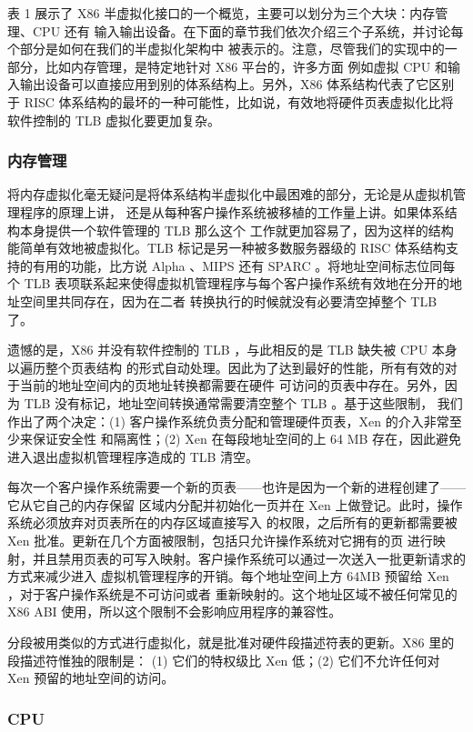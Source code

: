 表 1 展示了 X86 半虚拟化接口的一个概览，主要可以划分为三个大块：内存管理、CPU 还有
输入输出设备。在下面的章节我们依次介绍三个子系统，并讨论每个部分是如何在我们的半虚拟化架构中
被表示的。注意，尽管我们的实现中的一部分，比如内存管理，是特定地针对 X86 平台的，许多方面
例如虚拟 CPU 和输入输出设备可以直接应用到别的体系结构上。另外，X86 体系结构代表了它区别于
RISC 体系结构的最坏的一种可能性，比如说，有效地将硬件页表虚拟化比将软件控制的 TLB
虚拟化要更加复杂。

\subsubsection{内存管理}

将内存虚拟化毫无疑问是将体系结构半虚拟化中最困难的部分，无论是从虚拟机管理程序的原理上讲，
还是从每种客户操作系统被移植的工作量上讲。如果体系结构本身提供一个软件管理的 TLB 那么这个
工作就更加容易了，因为这样的结构能简单有效地被虚拟化。TLB 标记是另一种被多数服务器级的 RISC
体系结构支持的有用的功能，比方说 Alpha 、MIPS 还有 SPARC 。将地址空间标志位同每个 TLB
表项联系起来使得虚拟机管理程序与每个客户操作系统有效地在分开的地址空间里共同存在，因为在二者
转换执行的时候就没有必要清空掉整个 TLB 了。

遗憾的是，X86 并没有软件控制的 TLB ，与此相反的是 TLB 缺失被 CPU 本身以遍历整个页表结构
的形式自动处理。因此为了达到最好的性能，所有有效的对于当前的地址空间内的页地址转换都需要在硬件
可访问的页表中存在。另外，因为 TLB 没有标记，地址空间转换通常需要清空整个 TLB 。基于这些限制，
我们作出了两个决定：(1) 客户操作系统负责分配和管理硬件页表，Xen 的介入非常至少来保证安全性
和隔离性；(2) Xen 在每段地址空间的上 64 MB 存在，因此避免进入退出虚拟机管理程序造成的 TLB
清空。

每次一个客户操作系统需要一个新的页表——也许是因为一个新的进程创建了——它从它自己的内存保留
区域内分配并初始化一页并在 Xen 上做登记。此时，操作系统必须放弃对页表所在的内存区域直接写入
的权限，之后所有的更新都需要被 Xen 批准。更新在几个方面被限制，包括只允许操作系统对它拥有的页
进行映射，并且禁用页表的可写入映射。客户操作系统可以通过一次送入一批更新请求的方式来减少进入
虚拟机管理程序的开销。每个地址空间上方 64MB 预留给 Xen ，对于客户操作系统是不可访问或者
重新映射的。这个地址区域不被任何常见的 X86 ABI 使用，所以这个限制不会影响应用程序的兼容性。

分段被用类似的方式进行虚拟化，就是批准对硬件段描述符表的更新。X86 里的段描述符惟独的限制是：
(1) 它们的特权级比 Xen 低；(2) 它们不允许任何对 Xen 预留的地址空间的访问。

\subsubsection{CPU}

